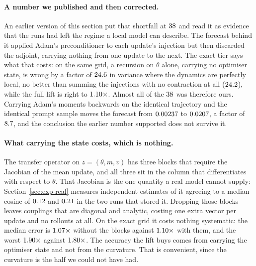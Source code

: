 \paragraph{A number we published and then corrected.} An earlier version of this section put that
shortfall at $38$ and read it as evidence that the runs had left the
regime a local model can describe. The forecast behind it applied Adam's preconditioner to each
update's injection but then discarded the adjoint, carrying nothing from one update to the next.
The exact tier says what that costs: on the same grid, a recursion on $\theta$ alone, carrying no
optimiser state, is wrong by a factor of $24.6$ in variance where the dynamics
are perfectly local, no better than summing the injections with no contraction at all
($24.2$), while the full lift is right to $1.10\times$. Almost all of the $38$ was therefore ours. Carrying
Adam's moments backwards on the identical trajectory and the identical prompt sample moves the
forecast from $0.00237$ to $0.0207$, a factor of
$8.7$, and the conclusion the earlier number supported does not survive it.

\paragraph{What carrying the state costs, which is nothing.} The transfer operator on
$z = (\theta, m, v)$ has three blocks that require the Jacobian of the mean update, and all three
sit in the column that differentiates with respect to $\theta$. That Jacobian is the one quantity a
real model cannot supply: Section~\ref{sec:exp-real} measures independent estimates of it agreeing
to a median cosine of $0.12$ and $0.21$ in the two runs that stored it. Dropping those blocks leaves
couplings that are diagonal and analytic, costing one extra vector per update and no rollouts at
all. On the exact grid it costs nothing systematic: the median error is
$1.07\times$ without the blocks against $1.10\times$ with them,
and the worst $1.90\times$ against $1.80\times$. The accuracy the
lift buys comes from carrying the optimiser state and not from the curvature. That is convenient, since the curvature is the half we
could not have had.

